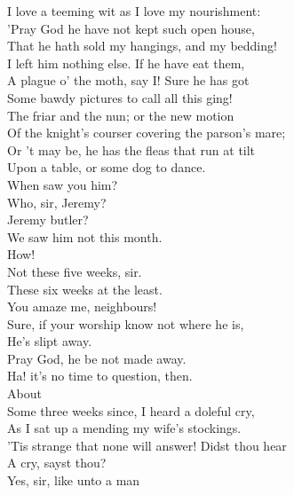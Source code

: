 \documentclass[a4paper,oneside]{memoir}
\begin{document}
\begin{drama*}
I love a teeming wit as I love my nourishment:\\
'Pray God he have not kept such open house,\\
That he hath sold my hangings, and my bedding!\\
I left him nothing else. If he have eat them,\\
A plague o' the moth, say I! Sure he has got\\
Some bawdy pictures to call all this ging!\\
The friar and the nun; or the new motion\\
Of the knight's courser covering the parson's mare;\\
Or 't may be, he has the fleas that run at tilt\\
Upon a table, or some dog to dance.\\
When saw you him?\\
\neighonespeaks {} Who, sir, Jeremy?\\
\neightwospeaks {} Jeremy butler?\\
We saw him not this month.\\
\lovewitspeaks {} How!\\
\neighfourspeaks {} Not these five weeks, sir.\\
\neighsixspeaks These six weeks at the least.\\
\lovewitspeaks {} You amaze me, neighbours!\\
\neighfivespeaks Sure, if your worship know not where he is,\\
He's slipt away.\\
\neighsixspeaks {} Pray God, he be not made away.\\
\lovewitspeaks Ha! it's no time to question, then.\\
\neighsixspeaks {} About\\
Some three weeks since, I heard a doleful cry,\\
As I sat up a mending my wife's stockings.\\
\lovewitspeaks 'Tis strange that none will answer! Didst thou hear\\
A cry, sayst thou?\\
\neighsixspeaks {} Yes, sir, like unto a man\\

\end{drama*}
\end{document}
